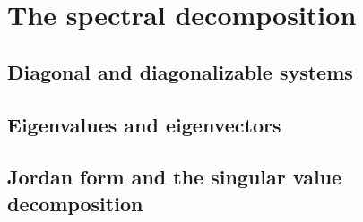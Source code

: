 
\chapter{The spectral decomposition}
\label{ch:spectral}

\section{Diagonal and diagonalizable systems}
\label{sec:sys}

\section{Eigenvalues and eigenvectors}
\label{sec:eigen}

\section{Jordan form and the singular value decomposition}

